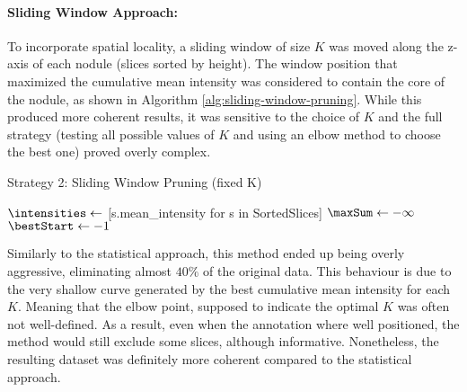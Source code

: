 \paragraph{Sliding Window Approach:} To incorporate spatial locality, a sliding window of size $K$ was moved along the z-axis of each nodule (slices sorted by height). The window position that maximized the cumulative mean intensity was considered to contain the core of the nodule, as shown in Algorithm \ref{alg:sliding-window-pruning}. While this produced more coherent results, it was sensitive to the choice of $K$ and the full strategy (testing all possible values of $K$ and using an elbow method to choose the best one) proved overly complex.

\begin{algorithm}[H]
    \caption{Strategy 2: Sliding Window Pruning (fixed K)}
    \label{alg:sliding-window-pruning}
    \DontPrintSemicolon
    \SetAlgoLined
    

    \BlankLine
    
    $\intensities \gets$ [s.mean\_intensity for s in SortedSlices]\;
    $\maxSum \gets -\infty$\;
    $\bestStart \gets -1$\;
    
    \;
\end{algorithm}

Similarly to the statistical approach, this method ended up being overly aggressive, eliminating almost $40\%$ of the original data. This behaviour is due to the very shallow curve generated by the best cumulative mean intensity for each $K$. Meaning that the elbow point, supposed to indicate the optimal $K$ was often not well-defined. As a result, even when the annotation where well positioned, the method would still exclude some slices, although informative.
Nonetheless, the resulting dataset was definitely more coherent compared to the statistical approach.

